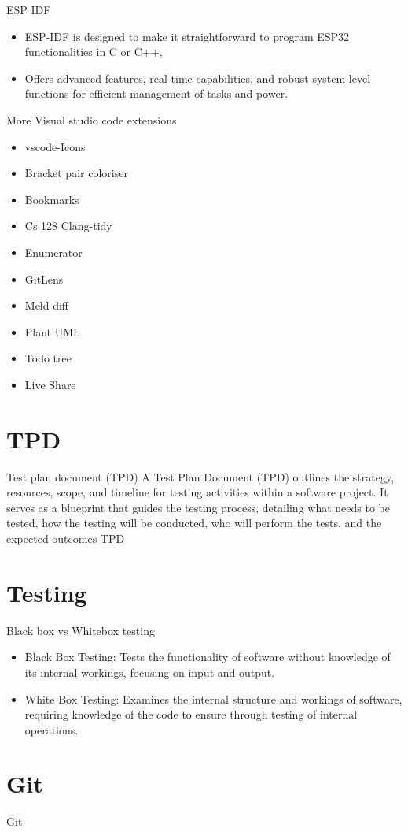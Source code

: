 \documentclass[10pt]{beamer}
\begin{document}
\begin{frame} {ESP IDF}
    \begin{itemize}
      \item  ESP-IDF is designed to make it straightforward to program ESP32 functionalities in C or C++, 
      \item Offers advanced features, real-time capabilities, and robust system-level functions for efficient management of tasks and power.
    \end{itemize}
\end{frame}

\begin{frame} {More Visual studio code extensions}
  \begin{itemize}
    \item vscode-Icons
    \item Bracket pair coloriser
    \item Bookmarks
    \item Cs 128 Clang-tidy
    \item Enumerator
    \item GitLens
    \item Meld diff
    \item Plant UML
    \item Todo tree
    \item Live Share
  \end{itemize}
  
\end{frame}

\section{TPD}
\begin{frame} {Test plan document (TPD)}
  A Test Plan Document (TPD) outlines the strategy, resources, scope, and timeline for testing activities within a software project. It serves as a blueprint that guides the testing process, detailing what needs to be tested, how the testing will be conducted, who will perform the tests, and the expected outcomes
  \href{https://docs.google.com/document/d/1lC8ZuRmzqU7DRiWEhfb8iwjCS3WTwKQk/edit?usp=sharing&ouid=109808472061203912811&rtpof=true&sd=true}{TPD}
\end{frame}

\section{Testing}
\begin{frame} {Black box vs Whitebox testing}
\begin{itemize}
  \item Black Box Testing: Tests the functionality of software without knowledge of its internal workings, focusing on input and output.
  \item White Box Testing: Examines the internal structure and workings of software, requiring knowledge of the code to ensure through testing of internal operations.
\end{itemize}
\end{frame}

\section{Git}
\begin{frame}{Git}
  
\end{frame}
\end{document}
